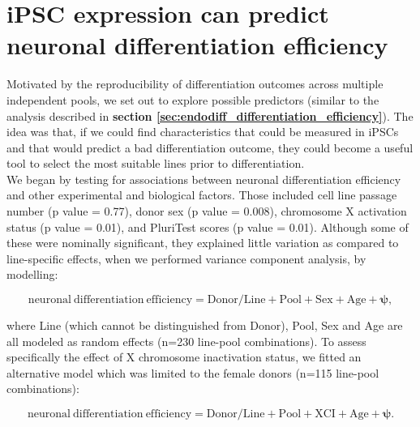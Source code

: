\clearpage

\section{iPSC expression can predict neuronal differentiation efficiency}
\label{sec:neuroseq_ips}

Motivated by the reproducibility of differentiation outcomes across multiple independent pools, we set out to explore possible predictors (similar to the analysis described in \textbf{section \ref{sec:endodiff_differentiation_efficiency}}).
The idea was that, if we could find characteristics that could be measured in iPSCs and that would predict 
a bad differentiation outcome, they could become a 
useful tool to select the most suitable lines prior to differentiation. \\

We began by testing for associations between neuronal differentiation efficiency and other experimental and biological factors.
Those included cell line passage number (p value = 0.77), donor sex (p value = 0.008), chromosome X activation status (p value = 0.01), and PluriTest scores \cite{muller2011bioinformatic} (p value = 0.01).
Although some of these were nominally significant, they explained little variation as compared to line-specific effects, when we performed variance component analysis, by modelling:

\begin{equation}\label{eq:neuroseq_vca}
    \mathrm{neuronal \ differentiation \ efficiency = Donor/Line + Pool + Sex + Age + \boldsymbol{\psi}},
\end{equation}

where Line (which cannot be distinguished from Donor), Pool, Sex and Age are all modeled as random effects (n=230 line-pool combinations).
To assess specifically the effect of X chromosome inactivation status, we fitted an alternative model which was limited to the female donors (n=115 line-pool combinations):

\begin{equation}\label{eq:neuroseq_vca_xci}
    \mathrm{neuronal \ differentiation \ efficiency = Donor/Line + Pool + XCI + Age + \boldsymbol{\psi}}. 
\end{equation}

